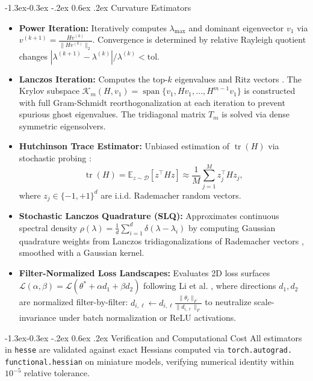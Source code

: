 \documentclass[10pt,twocolumn]{article}
\makeatletter
\renewcommand\subsection{\@startsection{subsection}{2}{\z@}%
                                     {-1.3ex\@plus -0.3ex \@minus -.2ex}%
                                     {0.6ex \@plus .2ex}%
                                     {\normalfont\normalsize\bfseries}}
\makeatother
\begin{document}
\subsection{Curvature Estimators}
\begin{itemize}
    \item \textbf{Power Iteration:} Iteratively computes $\lambda_{\max}$ and dominant eigenvector $v_1$ via $v^{(k+1)} = \frac{H v^{(k)}}{\|H v^{(k)}\|_2}$. Convergence is determined by relative Rayleigh quotient changes $|\lambda^{(k+1)} - \lambda^{(k)}| / \lambda^{(k)} < \text{tol}$.
    \item \textbf{Lanczos Iteration:} Computes the top-$k$ eigenvalues and Ritz vectors \cite{lanczos1950iteration}. The Krylov subspace $\mathcal{K}_m(H, v_1) = \operatorname{span}\{v_1, H v_1, \dots, H^{m-1} v_1\}$ is constructed with full Gram-Schmidt reorthogonalization at each iteration to prevent spurious ghost eigenvalues. The tridiagonal matrix $T_m$ is solved via dense symmetric eigensolvers.
    \item \textbf{Hutchinson Trace Estimator:} Unbiased estimation of $\operatorname{tr}(H)$ via stochastic probing \cite{hutchinson1989stochastic}:
    \begin{equation}
    \operatorname{tr}(H) = \mathbb{E}_{z \sim \mathcal{D}} [z^\top H z] \approx \frac{1}{M} \sum_{j=1}^M z_j^\top H z_j,
    \end{equation}
    where $z_j \in \{-1, +1\}^d$ are i.i.d. Rademacher random vectors.
    \item \textbf{Stochastic Lanczos Quadrature (SLQ):} Approximates continuous spectral density $\rho(\lambda) = \frac{1}{d} \sum_{i=1}^d \delta(\lambda - \lambda_i)$ by computing Gaussian quadrature weights from Lanczos tridiagonalizations of Rademacher vectors \cite{ubaru2017fast}, smoothed with a Gaussian kernel.
    \item \textbf{Filter-Normalized Loss Landscapes:} Evaluates 2D loss surfaces $\mathcal{L}(\alpha, \beta) = \mathcal{L}(\theta^* + \alpha d_1 + \beta d_2)$ following Li et al. \cite{li2018visualizing}, where directions $d_1, d_2$ are normalized filter-by-filter: $d_{i, \ell} \leftarrow d_{i, \ell} \frac{\|\theta_\ell\|_F}{\|d_{i, \ell}\|_F}$ to neutralize scale-invariance under batch normalization or ReLU activations.
\end{itemize}

\subsection{Verification and Computational Cost}
All estimators in \texttt{hesse} are validated against exact Hessians computed via \texttt{torch.autograd.} \texttt{functional.hessian} on miniature models, verifying numerical identity within $10^{-5}$ relative tolerance.
\end{document}
